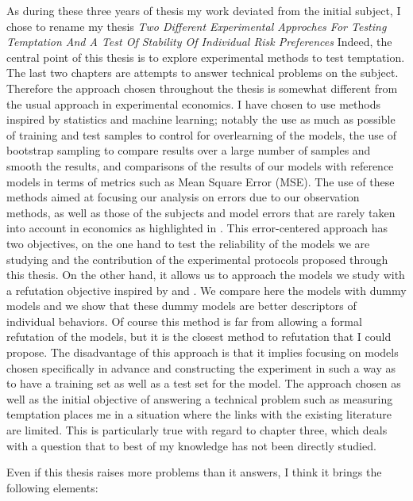 \documentclass[
]{book}
\begin{document}
As during these three years of thesis my work deviated from the initial subject,
I chose to rename my thesis \emph{Two Different Experimental Approches For Testing
Temptation And A Test Of Stability Of Individual Risk Preferences}
Indeed, the central point of this thesis is to explore experimental methods to
test temptation.
The last two chapters are attempts to answer technical problems on the subject.
Therefore the approach chosen throughout the thesis is somewhat different from
the usual approach in experimental economics.
I have chosen to use methods inspired by statistics and machine learning;
notably the use as much as possible of training and test samples to control for
overlearning of the models, the use of bootstrap sampling to compare results
over a large number of samples and smooth the results, and comparisons of the
results of our models with reference models in terms of metrics such as Mean
Square Error (MSE).
The use of these methods aimed at focusing our analysis on errors due to our
observation methods, as well as those of the subjects and model errors that are
rarely taken into account in economics as highlighted in \citet{taleb2005fooled}.
This error-centered approach has two objectives, on the one hand to test the
reliability of the models we are studying and the contribution of the
experimental protocols proposed through this thesis.
On the other hand, it allows us to approach the models we study with a
refutation objective inspired by \citet{popper2005logic} and \citet{popper2014conjectures}.
We compare here the models with dummy models and we show that these dummy models
are better descriptors of individual behaviors.
Of course this method is far from allowing a formal refutation of the models, but it is the
closest method to refutation that I could propose.
The disadvantage of this approach is that it implies focusing on models chosen
specifically in advance and constructing the experiment in such a way as to have
a training set as well as a test set for the model.
The approach chosen as well as the initial objective of answering a technical
problem such as measuring temptation places me in a situation where the links
with the existing literature are limited. This is particularly true with regard to chapter
three, which deals with a question that to best of my knowledge has not been directly studied.

Even if this thesis raises more problems than it answers, I think it brings the
following elements:
\end{document}
